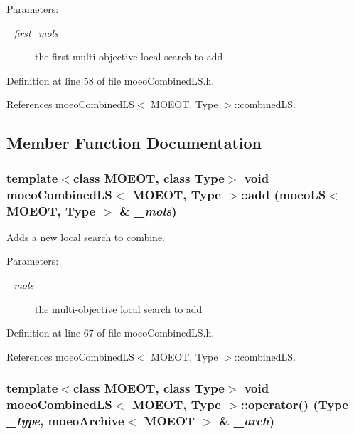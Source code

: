 \begin{Desc}
\item[Parameters:]
\begin{description}
\item[{\em \_\-first\_\-mols}]the first multi-objective local search to add \end{description}
\end{Desc}


Definition at line 58 of file moeo\-Combined\-LS.h.

References moeo\-Combined\-LS$<$ MOEOT, Type $>$::combined\-LS.

\subsection{Member Function Documentation}
\subsubsection{\setlength{\rightskip}{0pt plus 5cm}template$<$class MOEOT, class Type$>$ void \bf{moeo\-Combined\-LS}$<$ MOEOT, Type $>$::add (\bf{moeo\-LS}$<$ MOEOT, Type $>$ \& {\em \_\-mols})\hspace{0.3cm}{\tt  [inline]}}\label{classmoeoCombinedLS_1637b4dcf2dd694cc9ffbad605b2bf13}


Adds a new local search to combine. 

\begin{Desc}
\item[Parameters:]
\begin{description}
\item[{\em \_\-mols}]the multi-objective local search to add \end{description}
\end{Desc}


Definition at line 67 of file moeo\-Combined\-LS.h.

References moeo\-Combined\-LS$<$ MOEOT, Type $>$::combined\-LS.
\subsubsection{\setlength{\rightskip}{0pt plus 5cm}template$<$class MOEOT, class Type$>$ void \bf{moeo\-Combined\-LS}$<$ MOEOT, Type $>$::operator() (Type {\em \_\-type}, \bf{moeo\-Archive}$<$ MOEOT $>$ \& {\em \_\-arch})\hspace{0.3cm}{\tt  [inline, virtual]}}\label{classmoeoCombinedLS_634d7fa3092fe8f88a1b54cacfdc35fd}


